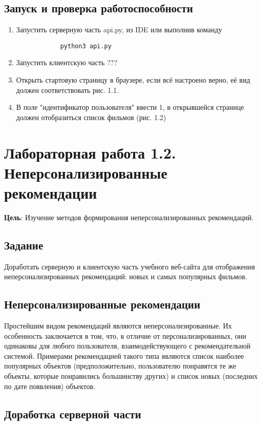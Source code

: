 \documentclass[a4paper,12pt]{report} %
\begin{document}
    \section{Запуск и проверка работоспособности}
    \begin{enumerate}
    	\item Запустить серверную часть api.py, из IDE или выполнив команду 
    	\begin{verbatim}
    		python3 api.py
    	\end{verbatim} 
        \item Запустить клиентскую часть ???
        \item Открыть стартовую страницу в браузере, если всё настроено верно, её вид должен соответствовать рис. 1.1.
        \item В поле "идентификатор пользователя" ввести 1, в открывшейся странице должен отобразиться список фильмов (рис. 1.2)
        
    \end{enumerate}

    \chapter {Лабораторная работа 1.2. Неперсонализированные рекомендации}
    \textbf{Цель}: Изучение методов формирования неперсонализированных рекомендаций.
    
    \section{Задание}
    Доработать серверную и клиентскую часть учебного веб-сайта для отображения неперсонализированных рекомендаций: новых и самых популярных фильмов.
    
    \section{Неперсонализированные рекомендации}
    Простейшим видом рекомендаций являются неперсонализированные. Их особенность заключается в том, что, в отличие от персонализированных, они одинаковы для любого пользователя, взаимодействующего с рекомендательной системой. Примерами рекомендацией такого типа являются список наиболее популярных объектов (предположительно, пользователю понравятся те же объекты, которые понравились большинству других) и список новых (последних по дате появления) объектов.    
    \section{Доработка серверной части}
\end{document}
